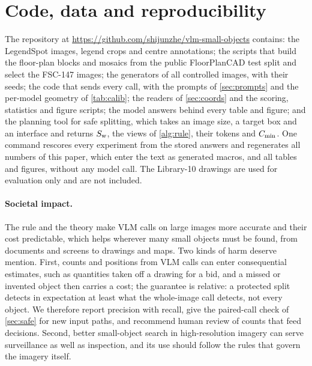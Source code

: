 \section{Code, data and reproducibility}
\label{sec:repro}

The repository at \url{https://github.com/shijunzhe/vlm-small-objects} contains:
the LegendSpot images, legend crops and centre annotations;
the scripts that build the floor-plan blocks and mosaics from the public FloorPlanCAD test split and select the FSC-147 images;
the generators of all controlled images, with their seeds;
the code that sends every call, with the prompts of \cref{sec:prompts} and the per-model geometry of \cref{tab:calib};
the readers of \cref{sec:coords} and the scoring, statistics and figure scripts;
the model answers behind every table and figure;
and the planning tool for safe splitting, which takes an image size, a target box and an interface and returns $S_{\mathrm{w}}$, the views of \cref{alg:rule}, their tokens and $C_{\min}$.
One command rescores every experiment from the stored answers and regenerates all numbers of this paper, which enter the text as generated macros, and all tables and figures, without any model call. The Library-10 drawings are used for evaluation only and are not included.

\paragraph{Societal impact.} The rule and the theory make VLM calls on large images more accurate and their cost predictable, which helps wherever many small objects must be found, from documents and screens to drawings and maps. Two kinds of harm deserve mention. First, counts and positions from VLM calls can enter consequential estimates, such as quantities taken off a drawing for a bid, and a missed or invented object then carries a cost; the guarantee is relative: a protected split detects in expectation at least what the whole-image call detects, not every object. We therefore report precision with recall, give the paired-call check of \cref{sec:safe} for new input paths, and recommend human review of counts that feed decisions. Second, better small-object search in high-resolution imagery can serve surveillance as well as inspection, and its use should follow the rules that govern the imagery itself.
